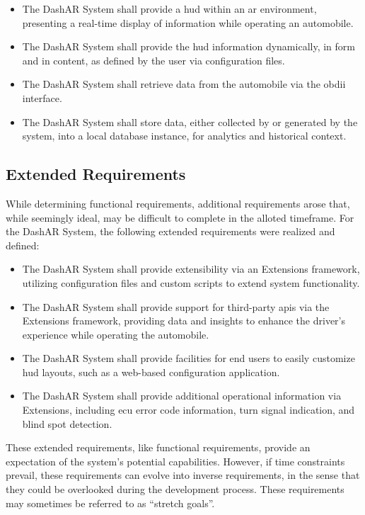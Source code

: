         \begin{itemize}
            \item The DashAR System shall provide a \gls{hud} within an \gls{ar} environment, presenting a real-time display of information while operating an automobile.
            \item The DashAR System shall provide the \gls{hud} information dynamically, in form and in content, as defined by the user via configuration files.
            \item The DashAR System shall retrieve data from the automobile via the \gls{obdii} interface.
            \item The DashAR System shall store data, either collected by or generated by the system, into a local database instance, for analytics and historical context.
        \end{itemize}

    \subsection{Extended Requirements}
        \par While determining functional requirements, additional requirements arose that, while seemingly ideal, may be difficult to complete in the alloted timeframe. For the DashAR System, the following extended requirements were realized and defined:

        \begin{itemize}
            \item The DashAR System shall provide extensibility via an Extensions framework, utilizing configuration files and custom scripts to extend system functionality.
            \item The DashAR System shall provide support for third-party \glspl{api} via the Extensions framework, providing data and insights to enhance the driver's experience while operating the automobile.
            \item The DashAR System shall provide facilities for end users to easily customize \gls{hud} layouts, such as a web-based configuration application.
            \item The DashAR System shall provide additional operational information via Extensions, including \gls{ecu} error code information, turn signal indication, and blind spot detection.
        \end{itemize}

        \par These extended requirements, like functional requirements, provide an expectation of the system's potential capabilities. However, if time constraints prevail, these requirements can evolve into inverse requirements, in the sense that they could be overlooked during the development process. These requirements may sometimes be referred to as ``stretch goals''.

